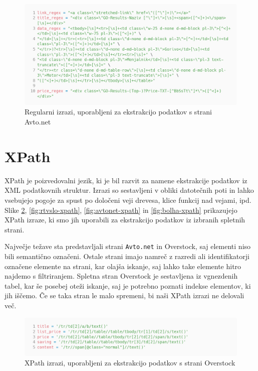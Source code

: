 \documentclass[conference]{IEEEtran}
\begin{document}
	\begin{figure}
		\centering
		\includegraphics[width=0.9\linewidth]{images/avtonet_regex}
		\caption{Regularni izrazi, uporabljeni za ekstrakcijo podatkov s strani Avto.net}
		\label{fig:avtonet-regex}
	\end{figure}

	\section{XPath}
	
	XPath je poizvedovalni jezik, ki je bil razvit za namene ekstrakcije podatkov iz XML podatkovnih struktur. Izrazi so sestavljeni v obliki datotečnih poti in lahko vsebujejo pogoje za spust po določeni veji drevesa, klice funkcij nad vejami, ipd. Slike \ref{fig:overstock-xpath}, \ref{fig:rtvslo-xpath}, \ref{fig:avtonet-xpath} in \ref{fig:bolha-xpath} prikazujejo XPath izraze, ki smo jih uporabili za ekstrakcijo podatkov iz izbranih spletnih strani.
	
	Največje težave sta predstavljali strani \texttt{Avto.net} in Overstock, saj elementi niso bili semantično označeni. Ostale strani imajo namreč z razredi ali identifikatorji označene elemente na strani, kar olajša iskanje, saj lahko take elemente hitro najdemo s filtriranjem. Spletna stran Overstock je sestavljena iz vgnezdenih tabel, kar še posebej oteži iskanje, saj je potrebno poznati indekse elementov, ki jih iščemo. Če se taka stran le malo spremeni, bi naši XPath izrazi ne delovali več.
	
	\begin{figure}
		\centering
		\includegraphics[width=0.9\linewidth]{images/overstock_xpath}
		\caption{XPath izrazi, uporabljeni za ekstrakcijo podatkov s strani Overstock}
		\label{fig:overstock-xpath}
	\end{figure}
\end{document}

